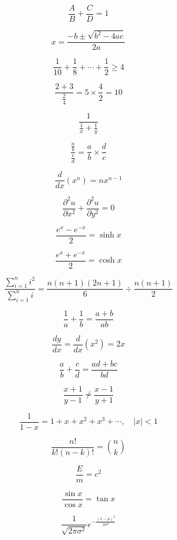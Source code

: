 \documentclass[preview, border=1pt, varwidth]{standalone}
\begin{document}
\[
\frac{A}{B} + \frac{C}{D} = 1
\]

\[
x = \frac{-b \pm \sqrt{b^2-4ac}}{2a}
\]

\[
\frac{1}{10} + \frac{1}{8} + \cdots + \frac{1}{2} \geq 4
\]

\[
\frac{2+3}{\frac{2}{4}} = 5 \times \frac{4}{2} = 10
\]

\[
\frac{1}{\frac{1}{x} + \frac{1}{y}}
\]

\[
\frac{\frac{a}{b}}{\frac{c}{d}} = \frac{a}{b} \times \frac{d}{c}
\]

\[
\frac{d}{dx} \left( x^n \right) = n x^{n-1}
\]

\[
\frac{\partial^2 u}{\partial x^2} + \frac{\partial^2 u}{\partial y^2} = 0
\]

\[
\frac{e^x - e^{-x}}{2} = \sinh x
\]

\[
\frac{e^x + e^{-x}}{2} = \cosh x
\]

\[
\frac{\sum_{i=1}^{n} i^2}{\sum_{i=1}^{n} i} = \frac{n(n+1)(2n+1)}{6} \div \frac{n(n+1)}{2}
\]

\[
\frac{1}{a} + \frac{1}{b} = \frac{a+b}{ab}
\]

\[
\frac{dy}{dx} = \frac{d}{dx} (x^2) = 2x
\]

\[
\frac{a}{b} + \frac{c}{d} = \frac{ad + bc}{bd}
\]

\[
\frac{x+1}{y-1} \neq \frac{x-1}{y+1}
\]

\[
\frac{1}{1 - x} = 1 + x + x^2 + x^3 + \cdots, \quad |x| < 1
\]

\[
\frac{n!}{k!(n-k)!} = \binom{n}{k}
\]

\[
\frac{E}{m} = c^2
\]

\[
\frac{\sin x}{\cos x} = \tan x
\]

\[
\frac{1}{\sqrt{2\pi \sigma^2}} e^{-\frac{(x - \mu)^2}{2\sigma^2}}
\]
\end{document}
